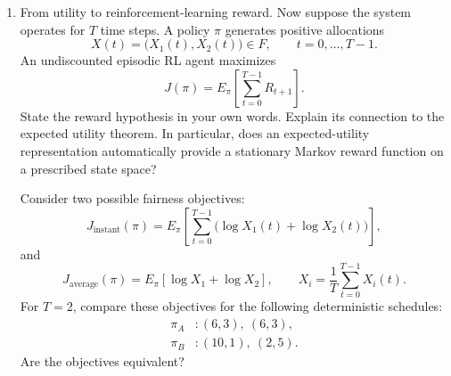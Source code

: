 \documentclass[11pt]{article}
\begin{document}
\begin{enumerate}[label=\arabic*., leftmargin=1.6em]
\begin{enumerate}
Does the theorem require utility to be concave or logarithmic? Does it determine
a fair allocation across users?

Explain why applying an arbitrary strictly increasing transformation to utility
can preserve preferences over deterministic outcomes while changing preferences
over lotteries. Use part (d) as an illustration.

\textbf{Solution.}
For a finite outcome set, let \(\succeq\) be a preference on lotteries. If it is complete, transitive, continuous, and independent, then there is a utility \(u\) on outcomes such that
\[
p\succeq q
\iff
\sum_{x} p(x)\,u(x)
\ge
\sum_{x} q(x)\,u(x).
\]
The four axioms are: completeness; transitivity; continuity (if \(p\succ q\succ r\), some mixtures of \(p\) and \(r\) lie strictly above and below \(q\)); independence (if \(p\succeq q\), then mixing both with any common lottery preserves the ranking). The representation is unique up to positive affine transformations \(v=\alpha u+\beta\) with \(\alpha>0\).

The theorem does not require concavity or the logarithm; any \(u\) is allowed, and concavity is the extra assumption of risk aversion. It ranks lotteries for one decision maker. It does not compare users or select a fair allocation.

A strictly increasing \(\varphi\) preserves rankings of deterministic outcomes, because \(\varphi(u(x))\ge\varphi(u(y))\) if and only if \(u(x)\ge u(y)\). It need not preserve rankings of lotteries, because \(E[\varphi(u(X))]\) is not \(\varphi(E[u(X)])\) unless \(\varphi\) is affine. In (d), \(u(x)=x\) and \(v(x)=\log x\) order sure payoffs identically, and both options have mean \(5\), so \(u\) is indifferent. Expected log utility prefers the sure payoff \(5\) to the lottery.

\item From utility to reinforcement-learning reward. Now suppose the system operates
for $T$ time steps. A policy $\pi$ generates positive allocations
\[
X(t)=\bigl(X_{1}(t),X_{2}(t)\bigr)\in F, \qquad t=0,\ldots,T-1.
\]
An undiscounted episodic RL agent maximizes
\[
J(\pi)=E_{\pi}\!\left[\sum_{t=0}^{T-1} R_{t+1}\right].
\]
State the reward hypothesis in your own words. Explain its connection to the
expected utility theorem. In particular, does an expected-utility representation
automatically provide a stationary Markov reward function on a prescribed state
space?

Consider two possible fairness objectives:
\[
J_{\mathrm{instant}}(\pi)
= E_{\pi}\!\left[\sum_{t=0}^{T-1}\bigl(\log X_{1}(t)+\log X_{2}(t)\bigr)\right],
\]
and
\[
J_{\mathrm{average}}(\pi)
= E_{\pi}\!\left[\log X_{1}+\log X_{2}\right],
\qquad
X_{i}=\frac{1}{T}\sum_{t=0}^{T-1} X_{i}(t).
\]
For $T=2$, compare these objectives for the following deterministic schedules:
\begin{align*}
\pi_{A}&: (6,3),\ (6,3), \\
\pi_{B}&: (10,1),\ (2,5).
\end{align*}
Are the objectives equivalent?


\end{enumerate}
\end{enumerate}
\end{document}
